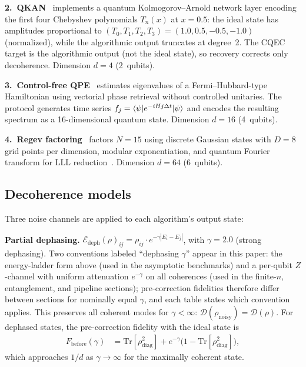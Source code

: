 \documentclass[a4paper,twocolumn]{quantumarticle}
\begin{document}
\textbf{2.\ QKAN}~\cite{Ivashkov2024} implements a quantum Kolmogorov--Arnold network layer encoding the first four Chebyshev polynomials $T_n(x)$ at $x = 0.5$: the ideal state has amplitudes proportional to $(T_0, T_1, T_2, T_3) = (1.0, 0.5, -0.5, -1.0)$ (normalized), while the algorithmic output truncates at degree~2.
The CQEC target is the algorithmic output (not the ideal state), so recovery corrects only decoherence.
Dimension $d = 4$ (2~qubits).

\textbf{3.\ Control-free QPE}~\cite{Clinton2026} estimates eigenvalues of a Fermi--Hubbard-type Hamiltonian using vectorial phase retrieval without controlled unitaries.
The protocol generates time series $f_j = \braket{\psi | e^{-iHj\Delta t} | \psi}$ and encodes the resulting spectrum as a 16-dimensional quantum state.
Dimension $d = 16$ (4~qubits).

\textbf{4.\ Regev factoring}~\cite{Regev2024} factors $N = 15$ using discrete Gaussian states with $D = 8$ grid points per dimension, modular exponentiation, and quantum Fourier transform for LLL reduction~\cite{LLL1982}.
Dimension $d = 64$ (6~qubits).


\subsection{Decoherence models}
\label{sec:noise}

Three noise channels are applied to each algorithm's output state:

\textbf{Partial dephasing.}
$\mathcal{E}_\mathrm{deph}(\rho)_{ij} = \rho_{ij} \cdot e^{-\gamma|E_i - E_j|}$, with $\gamma = 2.0$ (strong dephasing).
Two conventions labeled ``dephasing $\gamma$'' appear in this paper: the energy-ladder form above (used in the asymptotic benchmarks) and a per-qubit $Z$-channel with uniform attenuation $e^{-\gamma}$ on all coherences (used in the finite-$n$, entanglement, and pipeline sections); pre-correction fidelities therefore differ between sections for nominally equal $\gamma$, and each table states which convention applies.
This preserves all coherent modes for $\gamma < \infty$: $\mathcal{D}(\rho_\mathrm{noisy}) = \mathcal{D}(\rho)$.
For dephased states, the pre-correction fidelity with the ideal state is
\begin{align}
F_\mathrm{before}(\gamma) &= \mathrm{Tr}[\rho_\mathrm{diag}^2] + e^{-\gamma}\bigl(1 - \mathrm{Tr}[\rho_\mathrm{diag}^2]\bigr),
\label{eq:fidelity_decay}
\end{align}
which approaches $1/d$ as $\gamma \to \infty$ for the maximally coherent state.
\end{document}
